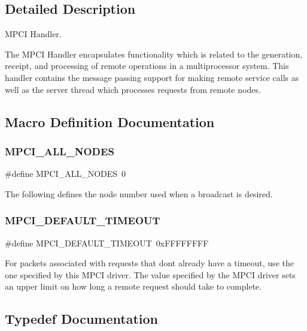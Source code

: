 \subsection{Detailed Description}
M\+P\+CI Handler. 

The M\+P\+CI Handler encapsulates functionality which is related to the generation, receipt, and processing of remote operations in a multiprocessor system. This handler contains the message passing support for making remote service calls as well as the server thread which processes requests from remote nodes. 

\subsection{Macro Definition Documentation}
\mbox{\label{group__RTEMSScoreMPCI_ga4dc053d46dbd83064840e1166276ece9}} 
\subsubsection{\texorpdfstring{MPCI\_ALL\_NODES}{MPCI\_ALL\_NODES}}
{\footnotesize\ttfamily \#define M\+P\+C\+I\+\_\+\+A\+L\+L\+\_\+\+N\+O\+D\+ES~0}

The following defines the node number used when a broadcast is desired. \mbox{\label{group__RTEMSScoreMPCI_ga0827bfc7e7f590734da1315634b3b8d2}} 
\subsubsection{\texorpdfstring{MPCI\_DEFAULT\_TIMEOUT}{MPCI\_DEFAULT\_TIMEOUT}}
{\footnotesize\ttfamily \#define M\+P\+C\+I\+\_\+\+D\+E\+F\+A\+U\+L\+T\+\_\+\+T\+I\+M\+E\+O\+UT~0x\+F\+F\+F\+F\+F\+F\+FF}

For packets associated with requests that don\textquotesingle{}t already have a timeout, use the one specified by this M\+P\+CI driver. The value specified by the M\+P\+CI driver sets an upper limit on how long a remote request should take to complete. 

\subsection{Typedef Documentation}
\mbox{\label{group__RTEMSScoreMPCI_ga110fdd671fbc411706e2b281c1685816}} 
